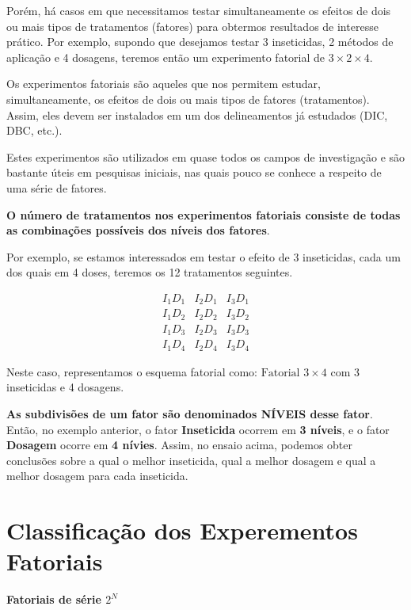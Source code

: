 \documentclass[
]{book}
\begin{document}
Porém, há casos em que necessitamos testar simultaneamente os efeitos de dois ou mais tipos de tratamentos (fatores) para obtermos resultados de interesse prático. Por exemplo, supondo que desejamos testar 3 inseticidas, 2 métodos de aplicação e 4 dosagens, teremos então um experimento fatorial de \(3\times2\times4\).

Os experimentos fatoriais são aqueles que nos permitem estudar, simultaneamente, os efeitos de dois ou mais tipos de fatores (tratamentos). Assim, eles devem ser instalados em um dos delineamentos já estudados (DIC, DBC, etc.).

Estes experimentos são utilizados em quase todos os campos de investigação e são bastante úteis em pesquisas iniciais, nas quais pouco se conhece a respeito de uma série de fatores.

\textbf{O número de tratamentos nos experimentos fatoriais consiste de todas as combinações possíveis dos níveis dos fatores}.

Por exemplo, se estamos interessados em testar o efeito de 3 inseticidas, cada um dos quais em 4 doses, teremos os 12 tratamentos seguintes.

\[
\begin{array}{} 
I_1 D_1  & I_2D_1  & I_3D_1 \\
I_1D_2  & I_2D_2  & I_3D_2 \\
I_1D_3  & I_2D_3  & I_3D_3 \\ 
I_1D_4  & I_2D_4  & I_3D_4 \end{array}
\]

Neste caso, representamos o esquema fatorial como: \(\text{Fatorial }3 \times 4\) com 3 inseticidas e 4 dosagens.

\textbf{As subdivisões de um fator são denominados NÍVEIS desse fator}. Então, no exemplo anterior, o fator \textbf{Inseticida} ocorrem em \textbf{3 níveis}, e o fator \textbf{Dosagem} ocorre em \textbf{4 nívies}. Assim, no ensaio acima, podemos obter conclusões sobre a qual o melhor inseticida, qual a melhor dosagem e qual a melhor dosagem para cada inseticida.

\hypertarget{classificauxe7uxe3o-dos-experementos-fatoriais}{%
\section{Classificação dos Experementos Fatoriais}\label{classificauxe7uxe3o-dos-experementos-fatoriais}}

\textbf{Fatoriais de série \(2^N\)}
\end{document}
